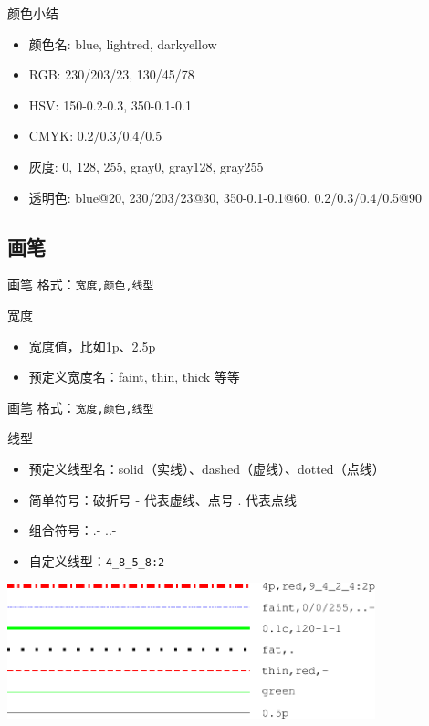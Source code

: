 \documentclass[UTF8, 11pt]{ctexbeamer}
\begin{document}
\begin{frame}{颜色小结}
\begin{itemize}
\item 颜色名: blue, lightred, darkyellow
\item RGB: 230/203/23, 130/45/78
\item HSV: 150-0.2-0.3, 350-0.1-0.1
\item CMYK: 0.2/0.3/0.4/0.5
\item 灰度: 0, 128, 255, gray0, gray128, gray255
\item 透明色: blue@20, 230/203/23@30, 350-0.1-0.1@60, 0.2/0.3/0.4/0.5@90
\end{itemize}
\end{frame}

\subsection{画笔}
\begin{frame}[fragile]{画笔}
格式：\verb|宽度,颜色,线型|
\begin{block}{宽度}
\begin{itemize}
\item 宽度值，比如1p、2.5p
\item 预定义宽度名：faint, thin, thick 等等
\end{itemize}
\end{block}
\end{frame}

\begin{frame}[fragile]{画笔}
格式：\verb|宽度,颜色,线型|
\begin{block}{线型}
\begin{itemize}
\item 预定义线型名：solid（实线）、dashed（虚线）、dotted（点线）
\item 简单符号：破折号 - 代表虚线、点号 . 代表点线
\item 组合符号：.-  ..-
\item 自定义线型：\verb|4_8_5_8:2|
\end{itemize}
\end{block}
\centering
\includegraphics[width=0.8\textwidth]{GMT_pens_examples}
\end{frame}
\end{document}

